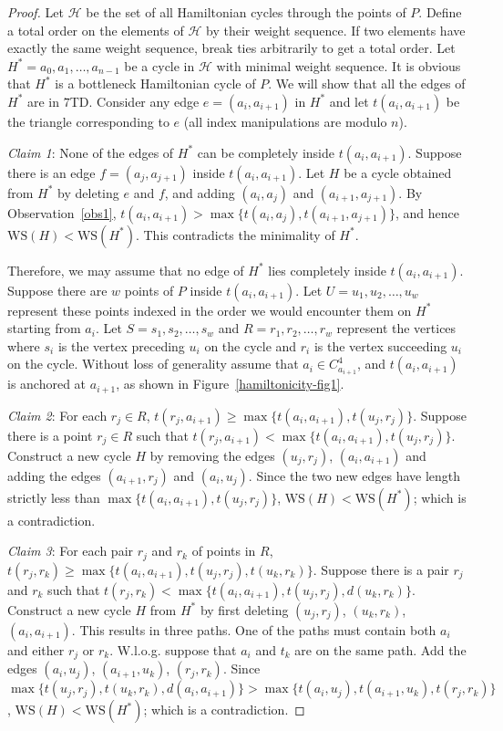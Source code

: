 \documentclass[11pt,a4paper]{article}
\newcommand{\kTD}[2]{$#1$\text{-}TD#2}
\newcommand{\WS}[1]{\text{WS$(#1)$}}
\begin{document}
\begin{proof}
Let $\mathcal{H}$ be the set of all Hamiltonian cycles through the points of $P$. Define a total
order on the elements of $\mathcal{H}$ by their weight sequence. If two elements have exactly the same weight sequence, break ties arbitrarily to get a total order. 
Let $H^* = a_0, a_1,\dots, a_{n−1}$ be a cycle in $\mathcal{H}$ with minimal weight sequence. It is obvious that $H^*$ is a bottleneck Hamiltonian cycle of $P$. We will show that all the edges of $H^*$ are in \kTD{7}{}. Consider any edge $e = (a_i, a_{i+1})$ in $H^*$ and let $t(a_i,a_{i+1})$ be the triangle corresponding to $e$ (all index manipulations are modulo $n$).

{\em Claim 1}: None of the edges of $H^*$ can be completely inside $t(a_i,a_{i+1})$. Suppose there is an edge $f=(a_j, a_{j+1})$ inside $t(a_i,a_{i+1})$. Let $H$ be a cycle obtained from $H^*$ by deleting $e$ and $f$, and adding $(a_i, a_j)$ and $(a_{i+1}, a_{j+1})$. By Observation~\ref{obs1}, $t(a_i, a_{i+1}) > \max\{t(a_i, a_j), t(a_{i+1}, a_{j+1})\}$, and hence $\WS{H}<\WS{H^*}$. This contradicts the minimality of $H^*$.

Therefore, we may assume that no edge of $H^*$ lies completely inside $t(a_i,a_{i+1})$. Suppose there are $w$ points of $P$ inside $t(a_i,a_{i+1})$. Let $U = u_1, u_2,\dots, u_w$ represent these points indexed in the order we would encounter them on $H^*$ starting from $a_i$. Let $S = s_1, s_2,\dots, s_w$ and $R = r_1, r_2,\dots, r_w$ represent the vertices where $s_i$ is the vertex preceding $u_i$ on the cycle and $r_i$ is the vertex succeeding $u_i$ on the cycle.
Without loss of generality assume that $a_i\in C_{a_{i+1}}^4$, and $t(a_i,a_{i+1})$ is anchored at $a_{i+1}$, as shown in Figure~\ref{hamiltonicity-fig1}. 

{\em Claim 2}: For each $r_j\in R$, $t(r_j, a_{i+1}) \ge \max\{t(a_i, a_{i+1}), t(u_j, r_j)\}$. Suppose there is a point $r_j\in R$ such that $t(r_j, a_{i+1}) < \max\{t(a_i, a_{i+1}), t(u_j, r_j)\}$. Construct a new cycle $H$ by removing the edges $(u_j, r_j)$, $(a_i, a_{i+1})$ and adding the edges $(a_{i+1}, r_j)$ and $(a_i, u_j)$. Since the two new edges have length strictly less than $\max\{t(a_i, a_{i+1}), t(u_j, r_j)\}$, $\WS{H} < \WS{H^*}$; which is a contradiction.

{\em Claim 3}: For each pair $r_j$ and $r_k$ of points in $R$, $t(r_j, r_k)\ge \max\{t(a_i, a_{i+1}), t(u_j,r_j),\allowbreak t(u_k,r_k)\}$. Suppose there is a pair $r_j$ and $r_k$ such that $t(r_j, r_k)< \max\{t(a_i, a_{i+1}), t(u_j,r_j),\allowbreak d(u_k,r_k)\}$.  Construct a new cycle $H$ from $H^*$ by first deleting $(u_j,r_j)$, $(u_k,r_k)$,  $(a_i, a_{i+1})$. This results in three paths. One of the paths must contain both $a_i$ and either $r_j$ or $r_k$. W.l.o.g. suppose that $a_i$ and $t_k$ are on the same path. Add the edges $(a_i, u_j)$, $(a_{i+1}, u_k)$, $(r_j, r_k)$. Since $\max\{t(u_j,r_j),\allowbreak t(u_k,r_k),\allowbreak d(a_i, a_{i+1})\}>\max \{t(a_i, u_j),\allowbreak t(a_{i+1}, u_k),\allowbreak t(r_j, r_k)\}$, $\WS{H} <\allowbreak \WS{H^*}$; which is a contradiction.


\end{proof}
\end{document}
